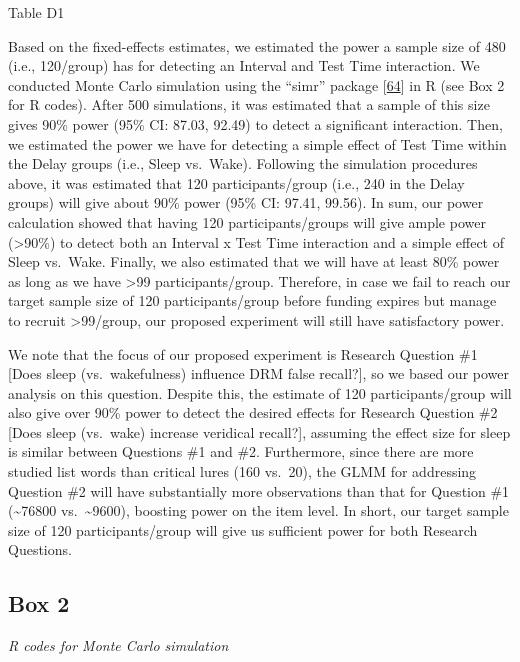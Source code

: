 \documentclass[
]{article}
\begin{document}
Table D1

Based on the fixed-effects estimates, we estimated the power a sample size of 480 (i.e., 120/group) has for detecting an Interval and Test Time interaction. We conducted Monte Carlo simulation using the ``simr'' package {[}\protect\hyperlink{ref-green2016a}{64}{]} in R (see Box 2 for R codes). After 500 simulations, it was estimated that a sample of this size gives 90\% power (95\% CI: 87.03, 92.49) to detect a significant interaction. Then, we estimated the power we have for detecting a simple effect of Test Time within the Delay groups (i.e., Sleep vs.~Wake). Following the simulation procedures above, it was estimated that 120 participants/group (i.e., 240 in the Delay groups) will give about 90\% power (95\% CI: 97.41, 99.56). In sum, our power calculation showed that having 120 participants/groups will give ample power (\textgreater90\%) to detect both an Interval x Test Time interaction and a simple effect of Sleep vs.~Wake. Finally, we also estimated that we will have at least 80\% power as long as we have \textgreater99 participants/group. Therefore, in case we fail to reach our target sample size of 120 participants/group before funding expires but manage to recruit \textgreater99/group, our proposed experiment will still have satisfactory power.

We note that the focus of our proposed experiment is Research Question \#1 {[}Does sleep (vs.~wakefulness) influence DRM false recall?{]}, so we based our power analysis on this question. Despite this, the estimate of 120 participants/group will also give over 90\% power to detect the desired effects for Research Question \#2 {[}Does sleep (vs.~wake) increase veridical recall?{]}, assuming the effect size for sleep is similar between Questions \#1 and \#2. Furthermore, since there are more studied list words than critical lures (160 vs.~20), the GLMM for addressing Question \#2 will have substantially more observations than that for Question \#1 (\textasciitilde76800 vs.~\textasciitilde9600), boosting power on the item level. In short, our target sample size of 120 participants/group will give us sufficient power for both Research Questions.

\hypertarget{box-2}{%
\subsection*{Box 2}\label{box-2}}

\emph{R codes for Monte Carlo simulation}
\end{document}
